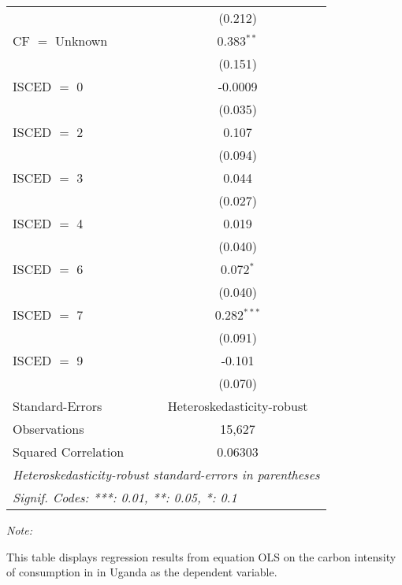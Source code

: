 \begin{table}[htbp!]
\begin{adjustbox}{width = 1\textwidth, max height = 0.95\textheight, center}
\begin{threeparttable}[b]
\begin{tabular}{lc}
                                & (0.212)\\   
            CF $=$ Unknown      & 0.383$^{**}$\\   
                                & (0.151)\\   
            ISCED $=$ 0         & -0.0009\\   
                                & (0.035)\\   
            ISCED $=$ 2         & 0.107\\   
                                & (0.094)\\   
            ISCED $=$ 3         & 0.044\\   
                                & (0.027)\\   
            ISCED $=$ 4         & 0.019\\   
                                & (0.040)\\   
            ISCED $=$ 6         & 0.072$^{*}$\\   
                                & (0.040)\\   
            ISCED $=$ 7         & 0.282$^{***}$\\   
                                & (0.091)\\   
            ISCED $=$ 9         & -0.101\\   
                                & (0.070)\\   
            \midrule 
            Standard-Errors     & Heteroskedasticity-robust \\   
            Observations        & 15,627\\  
            Squared Correlation & 0.06303\\  
            \midrule \midrule
            \multicolumn{2}{l}{\emph{Heteroskedasticity-robust standard-errors in parentheses}}\\
            \multicolumn{2}{l}{\emph{Signif. Codes: ***: 0.01, **: 0.05, *: 0.1}}\\
         \end{tabular}
         
         \begin{tablenotes}\item \medskip \textit{Note:}
            \item This table displays regression results from equation OLS on the carbon intensity of consumption in  in Uganda as the dependent variable. 
         \end{tablenotes}
      \end{threeparttable}
   \end{adjustbox}
\end{table}



